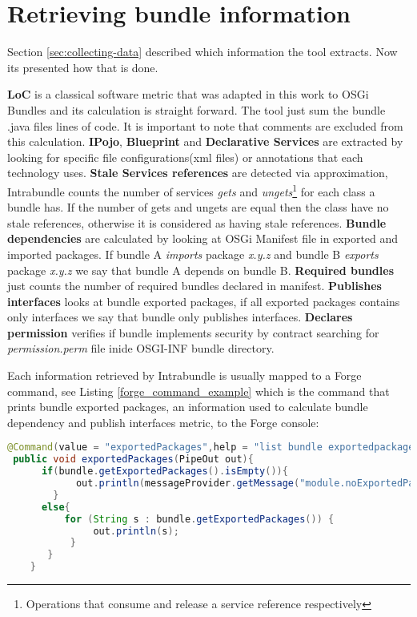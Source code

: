 \section{Retrieving bundle information}
Section \ref{sec:collecting-data} described which information the tool extracts. Now its presented how that is done.


\textbf{LoC} is a classical software metric that was adapted in this work to OSGi Bundles and its calculation is straight forward. The tool just sum the bundle .java files lines of code. It is important to note that comments are excluded from this calculation. 
\textbf{IPojo}, \textbf{Blueprint} and \textbf{Declarative Services} are extracted by looking for specific file configurations(xml files) or annotations that each technology uses.
\textbf{Stale Services references} are detected via approximation, Intrabundle counts the number of services \emph{gets} and \emph{ungets}\footnote{Operations that consume and release a service reference respectively} for each class a bundle has. If the number of gets and ungets are equal then the class have no stale references, otherwise it is considered as having stale references.
\textbf{Bundle dependencies} are calculated by looking at OSGi Manifest file in exported and imported packages. If bundle A \emph{imports} package \emph{x.y.z} and bundle B \emph{exports} package \emph{x.y.z} we say that bundle A depends on bundle B. 
\textbf{Required bundles} just counts the number of required bundles declared in manifest.
\textbf{Publishes interfaces} looks at bundle exported packages, if all exported packages contains only interfaces we say that bundle only publishes interfaces.
\textbf{Declares permission} verifies if bundle implements security by contract searching for \emph{permission.perm} file inide OSGI-INF bundle directory.

Each information retrieved by Intrabundle is usually mapped to a Forge command, see Listing \ref{forge_command_example} which is the command that prints bundle exported packages, an information used to calculate bundle dependency and publish interfaces metric, to the Forge console:
\pagebreak


\begin{lstlisting}[language=java,label=forge_command_example,caption=Exported packages command]
 @Command(value = "exportedPackages",help = "list bundle exportedpackages")
 public void exportedPackages(PipeOut out){
      if(bundle.getExportedPackages().isEmpty()){
            out.println(messageProvider.getMessage("module.noExportedPackages"));
        }
      else{
          for (String s : bundle.getExportedPackages()) {
               out.println(s);
           }
       }
    }
\end{lstlisting}
\FloatBarrier

